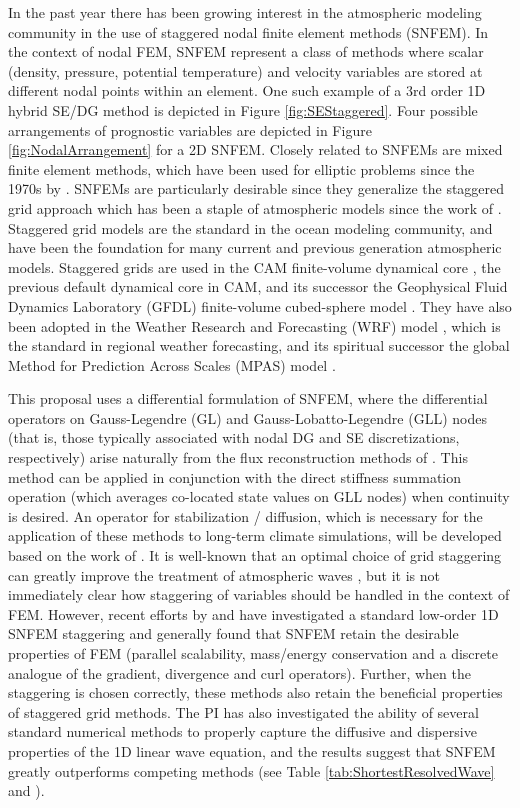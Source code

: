 \documentclass[11pt]{article}
\begin{document}
In the past year there has been growing interest in the atmospheric modeling community in the use of staggered nodal finite element methods (SNFEM).  In the context of nodal FEM, SNFEM represent a class of methods where scalar (density, pressure, potential temperature) and velocity variables are stored at different nodal points within an element.  One such example of a 3rd order 1D hybrid SE/DG method is depicted in Figure \ref{fig:SEStaggered}.  Four possible arrangements of prognostic variables are depicted in Figure \ref{fig:NodalArrangement} for a 2D SNFEM.  Closely related to SNFEMs are mixed finite element methods, which have been used for elliptic problems since the 1970s by \cite{PRJT1977MAFEM}.  SNFEMs are particularly desirable since they generalize the staggered grid approach which has been a staple of atmospheric models since the work of \cite{AAVRL1977GCM}.  Staggered grid models are the standard in the ocean modeling community, and have been the foundation for many current and previous generation atmospheric models.  Staggered grids are used in the CAM finite-volume dynamical core \citep{SJL2004MWR}, the previous default dynamical core in CAM, and its successor the Geophysical Fluid Dynamics Laboratory (GFDL) finite-volume cubed-sphere model \citep{WMPSJL2009NMSPF}.  They have also been adopted in the Weather Research and Forecasting (WRF) model \citep{SWCKJBDJetal2001}, which is the standard in regional weather forecasting, and its spiritual successor the global Method for Prediction Across Scales (MPAS) model \citep{WCSJBKMGDLDFSHPTDR2012MWR}.

This proposal uses a differential formulation of SNFEM, where the differential operators on Gauss-Legendre (GL) and Gauss-Lobatto-Legendre (GLL) nodes (that is, those typically associated with nodal DG and SE discretizations, respectively) arise naturally from the flux reconstruction methods of \cite{HTH2007AIAA}.  This method can be applied in conjunction with the direct stiffness summation operation (which averages co-located state values on GLL nodes) when continuity is desired.  An operator for stabilization / diffusion, which is necessary for the application of these methods to long-term climate simulations, will be developed based on the work of \cite{OGMNLJROMATPAU2013}.  It is well-known that an optimal choice of grid staggering can greatly improve the treatment of atmospheric waves \citep{DAR1994MWR}, but it is not immediately clear how staggering of variables should be handled in the context of FEM.  However, recent efforts by \cite{DBLG2009CS} and \cite{CJCJS2012JCP} have investigated a standard low-order 1D SNFEM staggering and generally found that SNFEM retain the desirable properties of FEM (parallel scalability, mass/energy conservation and a discrete analogue of the gradient, divergence and curl operators).  Further, when the staggering is chosen correctly, these methods also retain the beneficial properties of staggered grid methods.  The PI has also investigated the ability of several standard numerical methods to properly capture the diffusive and dispersive properties of the 1D linear wave equation, and the results suggest that SNFEM greatly outperforms competing methods (see Table \ref{tab:ShortestResolvedWave} and \cite{PAU2013QJRMS}).
\end{document}
